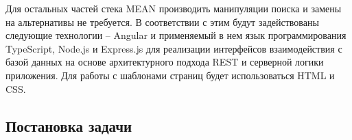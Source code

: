 Для остальных частей стека MEAN производить манипуляции поиска и замены на альтернативы не требуется.
В соответствии с этим будут задействованы следующие технологии -- Angular и применяемый в нем язык программирования TypeScript, Node.js и Express.js для реализации интерфейсов взаимодействия с базой данных на основе архитектурного подхода REST и серверной логики приложения.
Для работы с шаблонами страниц будет использоваться HTML и CSS.


\subsection{Постановка задачи}



\clearpage
